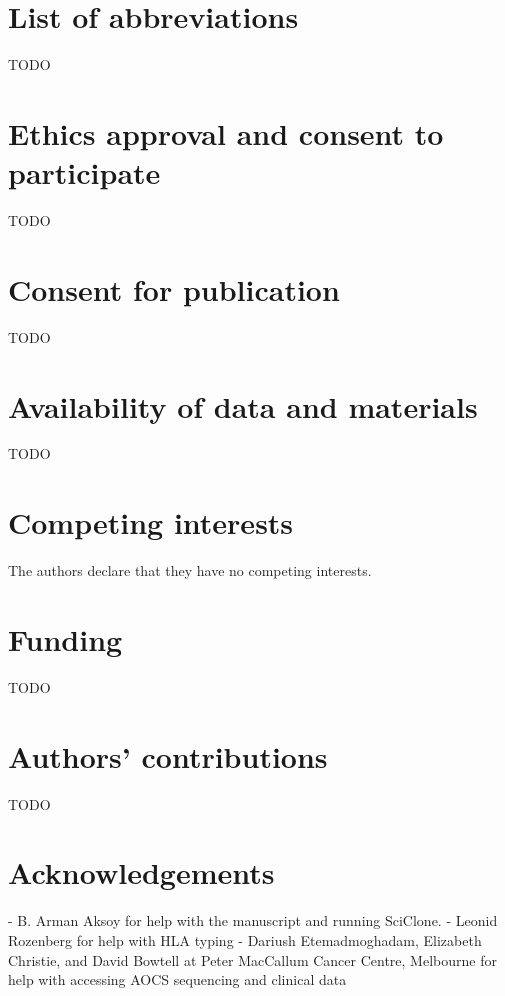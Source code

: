 \section{List of abbreviations}
TODO

\section{Ethics approval and consent to participate}
TODO

\section{Consent for publication}
TODO

\section{Availability of data and materials}
TODO

\section{Competing interests}
The authors declare that they have no competing interests.

\section{Funding}
TODO

\section{Authors' contributions}
TODO

\section{Acknowledgements}
- B. Arman Aksoy for help with the manuscript and running SciClone.
- Leonid Rozenberg for help with HLA typing
- Dariush Etemadmoghadam, Elizabeth Christie, and David Bowtell at Peter MacCallum Cancer Centre, Melbourne for help with accessing AOCS sequencing and clinical data

